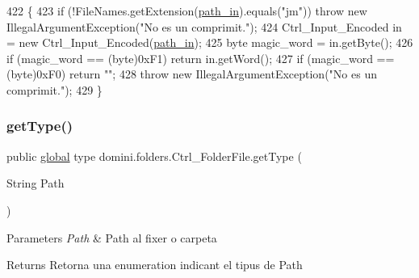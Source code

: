 \begin{DoxyCode}
422                                         \{
423         \textcolor{keywordflow}{if} (!FileNames.getExtension(\hyperlink{classdomini_1_1folders_1_1Ctrl__FolderFile_a0d3946bb2832a1f34d0c2227df5c71c4}{path\_in}).equals(\textcolor{stringliteral}{"jm"})) \textcolor{keywordflow}{throw} \textcolor{keyword}{new} IllegalArgumentException(\textcolor{stringliteral}{"No es
       un comprimit."});
424         Ctrl\_Input\_Encoded in = \textcolor{keyword}{new} Ctrl\_Input\_Encoded(\hyperlink{classdomini_1_1folders_1_1Ctrl__FolderFile_a0d3946bb2832a1f34d0c2227df5c71c4}{path\_in});
425         byte magic\_word = in.getByte();
426         \textcolor{keywordflow}{if} (magic\_word == (byte)0xF1) \textcolor{keywordflow}{return} in.getWord();
427         \textcolor{keywordflow}{if} (magic\_word == (byte)0xF0) \textcolor{keywordflow}{return} \textcolor{stringliteral}{""};
428         \textcolor{keywordflow}{throw} \textcolor{keyword}{new} IllegalArgumentException(\textcolor{stringliteral}{"No es un comprimit."});
429     \}
\end{DoxyCode}
\mbox{\label{classdomini_1_1folders_1_1Ctrl__FolderFile_a9e2ef751bdcb99083831c6b4e4761169}} 
\subsubsection{\texorpdfstring{get\+Type()}{getType()}}
{\footnotesize\ttfamily public \hyperlink{classglobal_1_1global}{global} type domini.\+folders.\+Ctrl\+\_\+\+Folder\+File.\+get\+Type (\begin{DoxyParamCaption}\item[{String}]{Path }\end{DoxyParamCaption})\hspace{0.3cm}{\ttfamily [inline]}}


\begin{DoxyParams}{Parameters}
{\em Path} & Path al fixer o carpeta \\
\hline
\end{DoxyParams}
\begin{DoxyReturn}{Returns}
Retorna una enumeration indicant el tipus de Path 
\end{DoxyReturn}

